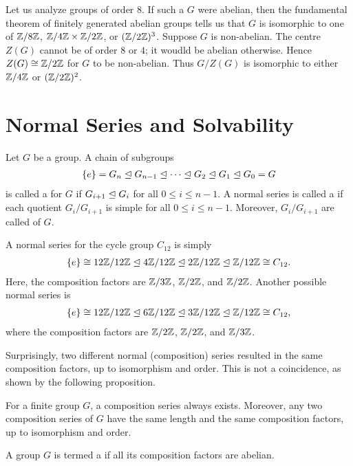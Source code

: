 \begin{example}
    Let us analyze groups of order $8$. If such a $G$ were abelian, then the fundamental theorem of finitely generated abelian groups tells us that $G$ is isomorphic to one of $\mathbb{Z}/8\mathbb{Z}$, $\mathbb{Z}/4\mathbb{Z} \times \mathbb{Z}/2\mathbb{Z}$, or $(\mathbb{Z}/2\mathbb{Z})^{3}$. Suppose $G$ is non-abelian. The centre $Z(G)$ cannot be of order $8$ or $4$; it woudld be abelian otherwise. Hence $Z(G) \cong \mathbb{Z}/2\mathbb{Z}$ for $G$ to be non-abelian. Thus $G/Z(G)$ is isomorphic to either $\mathbb{Z}/4\mathbb{Z}$ or $(\mathbb{Z}/2\mathbb{Z})^{2}$.
\end{example}

\section{Normal Series and Solvability}

\begin{definition}
    Let $G$ be a group. A chain of subgroups
    \begin{align}
        \{e\} = G_{n} \trianglelefteq G_{n-1} \trianglelefteq \cdots \trianglelefteq G_{2} \trianglelefteq G_{1} \trianglelefteq G_{0} = G
    \end{align}
    is called a  for $G$ if $G_{i+1} \trianglelefteq G_{i}$ for all $0 \leq i \leq n-1$. A normal series is called a  if each quotient $G_{i}/G_{i+1}$ is simple for all $0 \leq i \leq n-1$. Moreover, $G_{i}/G_{i+1}$ are called  of $G$.
\end{definition}

\begin{example}
    A normal series for the cycle group $C_{12}$ is simply
    \begin{align}
        \{e\} \cong 12\mathbb{Z}/12\mathbb{Z} \trianglelefteq 4\mathbb{Z}/12\mathbb{Z} \trianglelefteq 2\mathbb{Z}/12\mathbb{Z} \trianglelefteq \mathbb{Z}/12\mathbb{Z} \cong C_{12}.
    \end{align}
    Here, the composition factors are $\mathbb{Z}/3\mathbb{Z}$, $\mathbb{Z}/2\mathbb{Z}$, and $\mathbb{Z}/2\mathbb{Z}$. Another possible normal series is
    \begin{align}
        \{e\} \cong 12\mathbb{Z}/12\mathbb{Z} \trianglelefteq 6\mathbb{Z}/12\mathbb{Z} \trianglelefteq 3\mathbb{Z}/12\mathbb{Z} \trianglelefteq \mathbb{Z}/12\mathbb{Z} \cong C_{12},
    \end{align}
    where the composition factors are $\mathbb{Z}/2\mathbb{Z}$, $\mathbb{Z}/2\mathbb{Z}$, and $\mathbb{Z}/3\mathbb{Z}$.
\end{example}

Surprisingly, two different normal (composition) series resulted in the same composition factors, up to isomorphism and order. This is not a coincidence, as shown by the following proposition.

\begin{proposition}
    For a finite group $G$, a composition series always exists. Moreover, any two composition series of $G$ have the same length and the same composition factors, up to isomorphism and order.
\end{proposition}

\begin{definition}
    A group $G$ is termed a  if all its composition factors are abelian.
\end{definition}